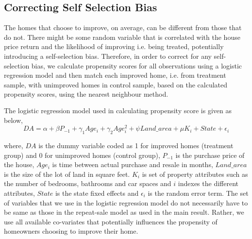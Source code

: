\documentclass[AEJ,reqno, draftmode]{AEA} %
\begin{document}




\subsection{Correcting Self Selection Bias}

The homes that choose to improve, on average, can be different from those that do not. There might be some random variable that is correlated with the house price return and the likelihood of improving i.e. being treated, potentially introducing a self-selection bias. Therefore, in order to correct for any self-selection bias, we calculate propensity scores for all observations using a logistic regression model and then match each improved home, i.e. from treatment sample, with unimproved homes in control sample, based on the calculated propensity scores, using the nearest neighbour method.

The logistic regression model used in calculating propensity score is given as below, \begin{equation} \label{eqn:logistic}
    DA = \alpha + \beta{P_{-1}}  + \gamma_1{Age_i} + \gamma_2{Age_i^2} + \psi{Land\_area} + \mu{K_i} + State + \epsilon_i
\end{equation}

where, $DA$ is the dummy variable coded as 1 for improved homes (treatment group) and 0 for unimproved homes (control group), $P_{-1}$ is the purchase price of the house, $Age_i$ is time between actual purchase and resale in months, $Land\_area$ is the size of the lot of land in square feet. $K_i$ is set of property attributes such as the number of bedrooms, bathrooms and car spaces and $i$ indexes the different attributes, $State$ is the state fixed effects and $\epsilon_i$ is the random error term. The set of variables that we use in the logistic regression model do not necessarily have to be same as those in the repeat-sale model as used in the main result. Rather, we use all available co-variates that potentially influences the propensity of homeowners choosing to improve their home.
    
\end{document}
